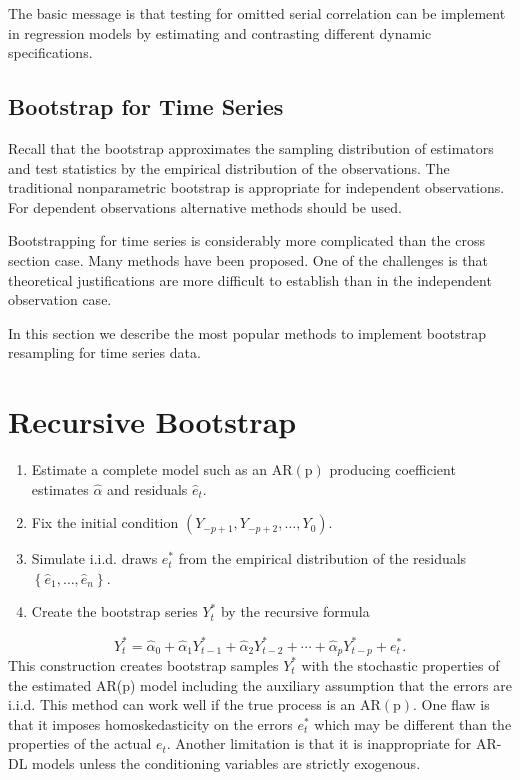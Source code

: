 \documentclass[10pt]{article}
\begin{document}
The basic message is that testing for omitted serial correlation can be implement in regression models by estimating and contrasting different dynamic specifications.

\subsection{Bootstrap for Time Series}
Recall that the bootstrap approximates the sampling distribution of estimators and test statistics by the empirical distribution of the observations. The traditional nonparametric bootstrap is appropriate for independent observations. For dependent observations alternative methods should be used.

Bootstrapping for time series is considerably more complicated than the cross section case. Many methods have been proposed. One of the challenges is that theoretical justifications are more difficult to establish than in the independent observation case.

In this section we describe the most popular methods to implement bootstrap resampling for time series data.

\section{Recursive Bootstrap}
\begin{enumerate}
  \item Estimate a complete model such as an $\mathrm{AR}(\mathrm{p})$ producing coefficient estimates $\widehat{\alpha}$ and residuals $\widehat{e}_{t}$.

  \item Fix the initial condition $\left(Y_{-p+1}, Y_{-p+2}, \ldots, Y_{0}\right)$.

  \item Simulate i.i.d. draws $e_{t}^{*}$ from the empirical distribution of the residuals $\left\{\widehat{e}_{1}, \ldots, \widehat{e}_{n}\right\}$.

  \item Create the bootstrap series $Y_{t}^{*}$ by the recursive formula

\end{enumerate}
$$
Y_{t}^{*}=\widehat{\alpha}_{0}+\widehat{\alpha}_{1} Y_{t-1}^{*}+\widehat{\alpha}_{2} Y_{t-2}^{*}+\cdots+\widehat{\alpha}_{p} Y_{t-p}^{*}+e_{t}^{*} .
$$
This construction creates bootstrap samples $Y_{t}^{*}$ with the stochastic properties of the estimated AR(p) model including the auxiliary assumption that the errors are i.i.d. This method can work well if the true process is an $\mathrm{AR}(\mathrm{p})$. One flaw is that it imposes homoskedasticity on the errors $e_{t}^{*}$ which may be different than the properties of the actual $e_{t}$. Another limitation is that it is inappropriate for AR-DL models unless the conditioning variables are strictly exogenous.
\end{document}
